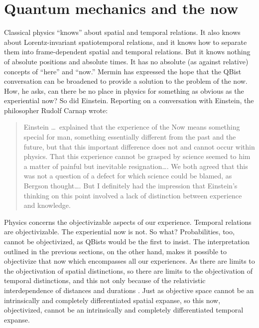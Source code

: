 \documentclass[12pt]{article}
\newcommand{\bq}{\begin{quote}}
\newcommand{\eq}{\end{quote}}
\begin{document}
\section{Quantum mechanics and the now}\label{sec_now}
Classical physics ``knows'' about spatial and temporal relations. It also knows about Lorentz-invariant spatiotemporal relations, and it knows how to separate them into frame-dependent spatial and temporal relations. But it knows nothing of absolute positions and absolute times. It has no absolute (as against relative) concepts of ``here'' and ``now.'' Mermin \cite{Mermin_Nature} has expressed the hope that the QBist conversation can be broadened to provide a solution to the problem of the now. How, he asks, can there be no place in physics for something as obvious as the experiential now? So did Einstein. Reporting on a conversation with Einstein, the philosopher Rudolf Carnap \cite{Carnap} wrote:
\bq
 Einstein \dots\ explained that the experience of the Now means something special for man, something essentially different from the past and the future, but that this important difference does not and cannot occur within physics. That this experience cannot be grasped by science seemed to him a matter of painful but inevitable resignation\dots. We both agreed that this was not a question of a defect for which science could be blamed, as Bergson thought\dots. But I definitely had the impression that Einstein's thinking on this point involved a lack of distinction between experience and knowledge.
\eq
Physics concerns the {objectivizable} aspects of our experience. Temporal relations are objectivizable. The experiential now is not. So what? Probabilities, too, cannot be objectivized, as QBists would be the first to insist. The interpretation outlined in the previous sections, on the other hand, makes it possible to objectivize that now which encompasses all our experiences. As there are limits to the objectivation of spatial distinctions, so there are limits to the objectivation of temporal distinctions, and this not only because of the relativistic interdependence of distances and durations \cite{Mohrhoff_Manifesting}. Just as objective space cannot be an intrinsically and completely differentiated spatial expanse, so this now, objectivized, cannot be an intrinsically and completely differentiated temporal expanse.
\end{document}
